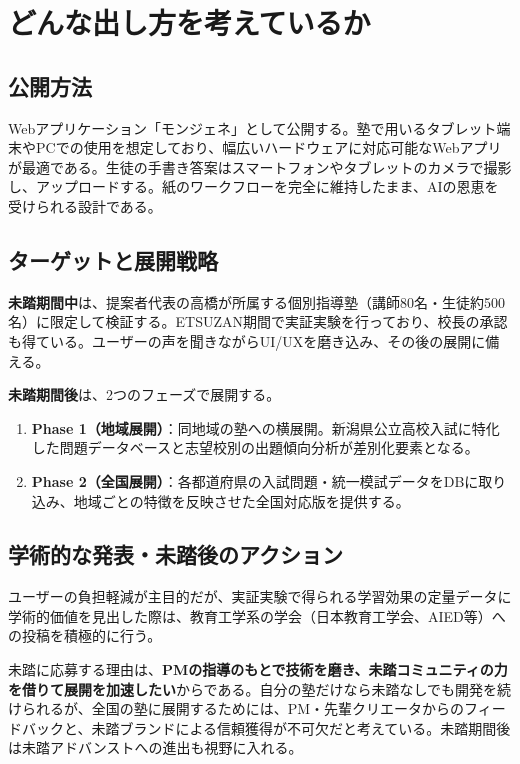 \documentclass[paper=a4,fontsize=10.5bp,jafontsize=10.5bp,twocolumn]{jlreq}
\begin{document}
\section{どんな出し方を考えているか}

\subsection{公開方法}

Webアプリケーション「モンジェネ」として公開する。塾で用いるタブレット端末やPCでの使用を想定しており、幅広いハードウェアに対応可能なWebアプリが最適である。生徒の手書き答案はスマートフォンやタブレットのカメラで撮影し、アップロードする。紙のワークフローを完全に維持したまま、AIの恩恵を受けられる設計である。

\subsection{ターゲットと展開戦略}

\textbf{未踏期間中}は、提案者代表の高橋が所属する個別指導塾（講師80名・生徒約500名）に限定して検証する。ETSUZAN期間で実証実験を行っており、校長の承認も得ている。ユーザーの声を聞きながらUI/UXを磨き込み、その後の展開に備える。

\textbf{未踏期間後}は、2つのフェーズで展開する。

\begin{enumerate}[leftmargin=2em]
  \item \textbf{Phase 1（地域展開）}：同地域の塾への横展開。新潟県公立高校入試に特化した問題データベースと志望校別の出題傾向分析が差別化要素となる。
  \item \textbf{Phase 2（全国展開）}：各都道府県の入試問題・統一模試データをDBに取り込み、地域ごとの特徴を反映させた全国対応版を提供する。
\end{enumerate}

\subsection{学術的な発表・未踏後のアクション}

ユーザーの負担軽減が主目的だが、実証実験で得られる学習効果の定量データに学術的価値を見出した際は、教育工学系の学会（日本教育工学会、AIED等）への投稿を積極的に行う。

未踏に応募する理由は、\textbf{PMの指導のもとで技術を磨き、未踏コミュニティの力を借りて展開を加速したい}からである。自分の塾だけなら未踏なしでも開発を続けられるが、全国の塾に展開するためには、PM・先輩クリエータからのフィードバックと、未踏ブランドによる信頼獲得が不可欠だと考えている。未踏期間後は未踏アドバンストへの進出も視野に入れる。
\end{document}
